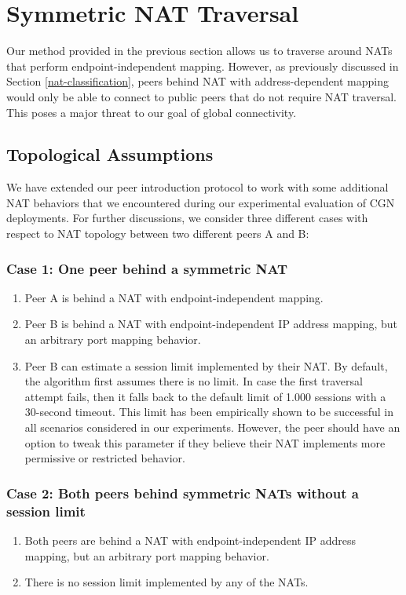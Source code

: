 \section{Symmetric NAT Traversal}
\label{symmetric-nat-traversal}

Our method provided in the previous section allows us to traverse around NATs that perform endpoint-independent mapping. However, as previously discussed in Section \ref{nat-classification}, peers behind NAT with address-dependent mapping would only be able to connect to public peers that do not require NAT traversal. This poses a major threat to our goal of global connectivity.


\subsection{Topological Assumptions}

We have extended our peer introduction protocol to work with some additional NAT behaviors that we encountered during our experimental evaluation of CGN deployments. For further discussions, we consider three different cases with respect to NAT topology between two different peers A and B:

\subsubsection{Case 1: One peer behind a symmetric NAT}

\begin{enumerate}
    \item Peer A is behind a NAT with endpoint-independent mapping.
    \item Peer B is behind a NAT with endpoint-independent IP address mapping, but an arbitrary port mapping behavior.
    \item Peer B can estimate a session limit implemented by their NAT. By default, the algorithm first assumes there is no limit. In case the first traversal attempt fails, then it falls back to the default limit of 1.000 sessions with a 30-second timeout. This limit has been empirically shown to be successful in all scenarios considered in our experiments. However, the peer should have an option to tweak this parameter if they believe their NAT implements more permissive or restricted behavior.
\end{enumerate}

\subsubsection{Case 2: Both peers behind symmetric NATs without a session limit}
\begin{enumerate}
    \item Both peers are behind a NAT with endpoint-independent IP address mapping, but an arbitrary port mapping behavior.
    \item There is no session limit implemented by any of the NATs.
\end{enumerate}

